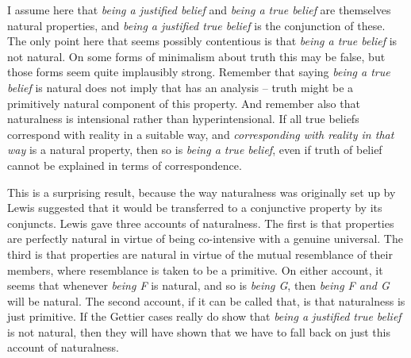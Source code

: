 \documentclass[
  11pt,
  letterpaper,
  DIV=11,
  numbers=noendperiod,
  oneside]{scrartcl}
\begin{document}
I assume here that \emph{being a justified belief} and \emph{being a
true belief} are themselves natural properties, and \emph{being a
justified true belief} is the conjunction of these. The only point here
that seems possibly contentious is that \emph{being a true belief} is
not natural. On some forms of minimalism about truth this may be false,
but those forms seem quite implausibly strong. Remember that saying
\emph{being a true belief} is natural does not imply that has an
analysis -- truth might be a primitively natural component of this
property. And remember also that naturalness is intensional rather than
hyperintensional. If all true beliefs correspond with reality in a
suitable way, and \emph{corresponding with reality in that way} is a
natural property, then so is \emph{being a true belief}, even if truth
of belief cannot be explained in terms of correspondence.

This is a surprising result, because the way naturalness was originally
set up by Lewis suggested that it would be transferred to a conjunctive
property by its conjuncts. Lewis gave three accounts of naturalness. The
first is that properties are perfectly natural in virtue of being
co-intensive with a genuine universal. The third is that properties are
natural in virtue of the mutual resemblance of their members, where
resemblance is taken to be a primitive. On either account, it seems that
whenever \emph{being F} is natural, and so is \emph{being G}, then
\emph{being F and G} will be natural. The second account, if it can be
called that, is that naturalness is just primitive. If the Gettier cases
really do show that \emph{being a justified true belief} is not natural,
then they will have shown that we have to fall back on just this account
of naturalness.
\end{document}
